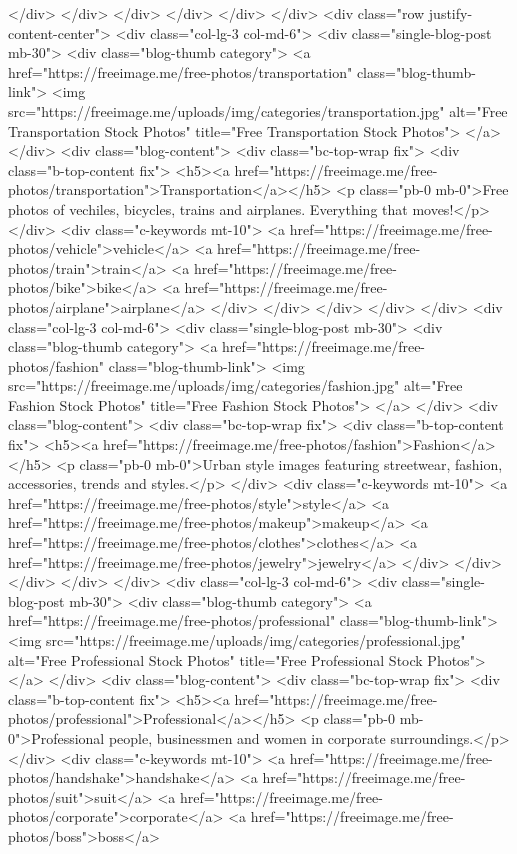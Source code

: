 </div>
</div>
</div>
</div>
</div>
</div>
<div class="row justify-content-center">
<div class="col-lg-3 col-md-6">
<div class="single-blog-post mb-30">
<div class="blog-thumb category">
<a href="https://freeimage.me/free-photos/transportation" class="blog-thumb-link">
<img src="https://freeimage.me/uploads/img/categories/transportation.jpg" alt="Free Transportation Stock Photos" title="Free Transportation Stock Photos">
</a>
</div>
<div class="blog-content">
<div class="bc-top-wrap fix">
<div class="b-top-content fix">
<h5><a href="https://freeimage.me/free-photos/transportation">Transportation</a></h5>
<p class="pb-0 mb-0">Free photos of vechiles, bicycles, trains and airplanes. Everything that moves!</p>
</div>
<div class="c-keywords mt-10">
<a href="https://freeimage.me/free-photos/vehicle">vehicle</a> <a href="https://freeimage.me/free-photos/train">train</a> <a href="https://freeimage.me/free-photos/bike">bike</a> <a href="https://freeimage.me/free-photos/airplane">airplane</a>
</div>
</div>
</div>
</div>
</div>
<div class="col-lg-3 col-md-6">
<div class="single-blog-post mb-30">
<div class="blog-thumb category">
<a href="https://freeimage.me/free-photos/fashion" class="blog-thumb-link">
<img src="https://freeimage.me/uploads/img/categories/fashion.jpg" alt="Free Fashion Stock Photos" title="Free Fashion Stock Photos">
</a>
</div>
<div class="blog-content">
<div class="bc-top-wrap fix">
<div class="b-top-content fix">
<h5><a href="https://freeimage.me/free-photos/fashion">Fashion</a></h5>
<p class="pb-0 mb-0">Urban style images featuring streetwear, fashion, accessories, trends and styles.</p>
</div>
<div class="c-keywords mt-10">
<a href="https://freeimage.me/free-photos/style">style</a> <a href="https://freeimage.me/free-photos/makeup">makeup</a> <a href="https://freeimage.me/free-photos/clothes">clothes</a> <a href="https://freeimage.me/free-photos/jewelry">jewelry</a>
 </div>
</div>
</div>
</div>
</div>
<div class="col-lg-3 col-md-6">
<div class="single-blog-post mb-30">
<div class="blog-thumb category">
<a href="https://freeimage.me/free-photos/professional" class="blog-thumb-link">
<img src="https://freeimage.me/uploads/img/categories/professional.jpg" alt="Free Professional Stock Photos" title="Free Professional Stock Photos">
</a>
</div>
<div class="blog-content">
<div class="bc-top-wrap fix">
<div class="b-top-content fix">
<h5><a href="https://freeimage.me/free-photos/professional">Professional</a></h5>
<p class="pb-0 mb-0">Professional people, businessmen and women in corporate surroundings.</p>
</div>
<div class="c-keywords mt-10">
<a href="https://freeimage.me/free-photos/handshake">handshake</a> <a href="https://freeimage.me/free-photos/suit">suit</a> <a href="https://freeimage.me/free-photos/corporate">corporate</a> <a href="https://freeimage.me/free-photos/boss">boss</a>
